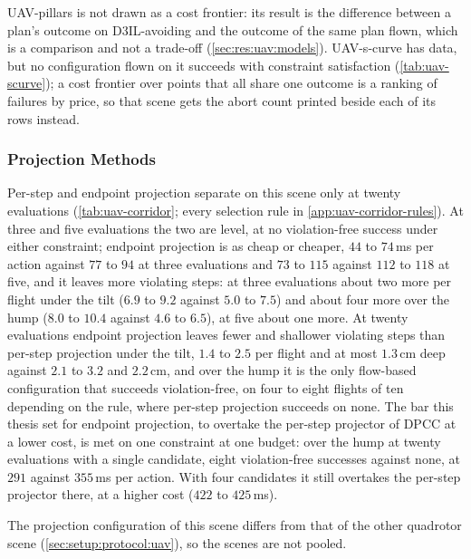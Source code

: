 UAV-pillars is not drawn as a cost frontier: its result is the difference between a plan's outcome on
D3IL-avoiding and the outcome of the same plan flown, which is a comparison and not a trade-off
(\autoref{sec:res:uav:models}). UAV-s-curve has data, but no configuration flown on it succeeds with
constraint satisfaction (\autoref{tab:uav-scurve}); a cost frontier over points that all share one outcome
is a ranking of failures by price, so that scene gets the abort count printed beside each of its rows
instead.

\FloatBarrier
\subsubsection{Projection Methods}\label{sec:res:uav:projection}
Per-step and endpoint projection separate on this scene only at twenty evaluations
(\autoref{tab:uav-corridor}; every selection rule in \autoref{app:uav-corridor-rules}). At three and five evaluations the two are level, at no
violation-free success under either constraint; endpoint projection is as cheap or cheaper, $44$ to
$74$\,ms per action against $77$ to $94$ at three evaluations and $73$ to $115$ against $112$ to $118$ at
five, and it leaves more violating steps: at three evaluations about two more per flight under the tilt
($6.9$ to $9.2$ against $5.0$ to $7.5$) and about four more over the hump ($8.0$ to $10.4$ against $4.6$
to $6.5$), at five about one more. At twenty evaluations endpoint projection leaves fewer and shallower
violating steps than per-step projection under the tilt, $1.4$ to $2.5$ per flight and at most
$1.3$\,cm deep against $2.1$ to $3.2$ and $2.2$\,cm, and
over the hump it is the only flow-based configuration that succeeds violation-free, on four to eight
flights of ten depending on the rule, where per-step projection succeeds on none. The bar this thesis set
for endpoint projection, to overtake the per-step projector of \ac{DPCC} at a lower cost, is met on one
constraint at one budget: over the hump at twenty evaluations with a single candidate, eight
violation-free successes against none, at $291$ against $355$\,ms per action. With four candidates it
still overtakes the per-step projector there, at a higher cost ($422$ to $425$\,ms).


The projection configuration of this scene differs from that of the other quadrotor scene
(\autoref{sec:setup:protocol:uav}), so the scenes are not pooled.

\FloatBarrier
